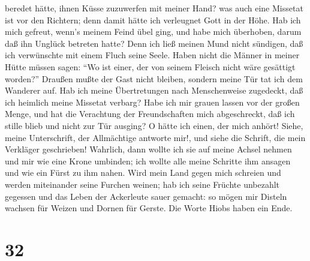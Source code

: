 beredet hätte, ihnen Küsse zuzuwerfen mit meiner Hand?  was
auch eine Missetat ist vor den Richtern; denn damit hätte ich verleugnet
Gott in der Höhe.  Hab ich mich gefreut, wenn's meinem
Feind übel ging, und habe mich überhoben, darum daß ihn Unglück betreten
hatte?  Denn ich ließ meinen Mund nicht sündigen, daß ich
verwünschte mit einem Fluch seine Seele.  Haben nicht die
Männer in meiner Hütte müssen sagen: ``Wo ist einer, der von seinem
Fleisch nicht wäre gesättigt worden?''  Draußen mußte der
Gast nicht bleiben, sondern meine Tür tat ich dem Wanderer auf.
 Hab ich meine Übertretungen nach Menschenweise zugedeckt,
daß ich heimlich meine Missetat verbarg?  Habe ich mir
grauen lassen vor der großen Menge, und hat die Verachtung der
Freundschaften mich abgeschreckt, daß ich stille blieb und nicht zur Tür
ausging?  O hätte ich einen, der mich anhört! Siehe, meine
Unterschrift, der Allmächtige antworte mir!, und siehe die Schrift, die
mein Verkläger geschrieben!  Wahrlich, dann wollte ich sie
auf meine Achsel nehmen und mir wie eine Krone umbinden; 
ich wollte alle meine Schritte ihm ansagen und wie ein Fürst zu ihm
nahen.  Wird mein Land gegen mich schreien und werden
miteinander seine Furchen weinen;  hab ich seine Früchte
unbezahlt gegessen und das Leben der Ackerleute sauer gemacht:
 so mögen mir Disteln wachsen für Weizen und Dornen für
Gerste. Die Worte Hiobs haben ein Ende.

\hypertarget{section-31}{%
\section{32}\label{section-31}}

